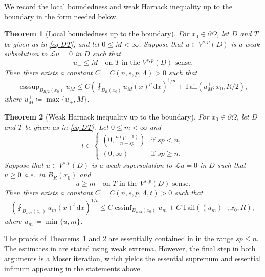 \documentclass[11pt]{amsart}
\theoremstyle{plain}
\newtheorem{theorem}{Theorem}[section]
\theoremstyle{definition}
\numberwithin{equation}{section}
\DeclareMathOperator*{\esssup}{esssup}
\DeclareMathOperator*{\essinf}{essinf}
\begin{document}
We record the local boundedness and weak Harnack inequality up to the boundary in the form needed below.

\begin{theorem}[Local boundedness up to the boundary]\label{thm-loc-bdd}
For $x_0 \in \partial \Omega$, let $D$ and $T$ be given as in \eqref{eq-DT}, and let $0 \leq M <\infty$. Suppose that $u \in V^{s, p}(D)$ is a weak subsolution to $\mathcal{L}u=0$ in $D$ such that
\begin{equation*}
u_+ \leq M \quad\text{on }T \text{ in the $V^{s, p}(D)$-sense}.
\end{equation*}
Then there exists a constant $C=C(n, s, p, \Lambda)>0$ such that
\begin{equation*}
\esssup_{B_{R/2}(x_0)} u_M^+ \leq C \left( \fint_{B_{R}(x_0)} u_M^+(x)^p \,\mathrm{d}x \right)^{1/p} + \mathrm{Tail}(u_M^+; x_0, R/2),
\end{equation*}
where $u_M^+ \coloneqq \max\{u_+, M\}$.
\end{theorem}

\begin{theorem}[Weak Harnack inequality up to the boundary]\label{thm-WHI}
For $x_0 \in \partial \Omega$, let $D$ and $T$ be given as in \eqref{eq-DT}. Let $0\leq m<\infty$ and
\begin{equation*}
t \in
\begin{cases}
(0, \frac{n(p-1)}{n-sp}) &\text{if }sp<n, \\
(0, \infty) &\text{if }sp \geq n.
\end{cases}
\end{equation*}
Suppose that $u \in V^{s, p}(D)$ is a weak supersolution to $\mathcal{L}u=0$ in $D$ such that $u \geq 0$ a.e.\ in $B_R(x_0)$ and
\begin{equation*}
u \geq m \quad\text{on }T \text{ in the $V^{s, p}(D)$-sense}.
\end{equation*}
Then there exists a constant $C=C(n, s, p, \Lambda, t)>0$ such that
\begin{equation*}
\left( \fint_{B_{R/2}(x_0)} u_m^-(x)^t \,\mathrm{d}x \right)^{1/t} \leq C \essinf_{B_{R/4}(x_0)} u_m^- + C\,\mathrm{Tail}((u_m^-)_-; x_0, R),
\end{equation*}
where $u_m^- \coloneqq \min\{u, m\}$.
\end{theorem}

The proofs of Theorems~\ref{thm-loc-bdd} and \ref{thm-WHI} are essentially contained in \cite[Theorems~3.5 and 3.7]{KLL23} in the range $sp \leq n$. The estimates in \cite[Theorems~3.5 and 3.7]{KLL23} are stated using weak extrema. However, the final step in both arguments is a Moser iteration, which yields the essential supremum and essential infimum appearing in the statements above.
\end{document}
